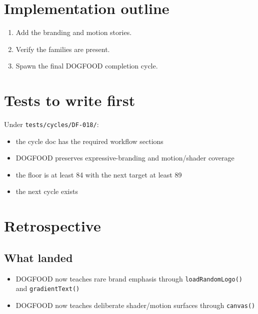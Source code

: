 \section{Implementation outline}\label{record-080-implementation-outline}

\begin{enumerate}
\def\labelenumi{\arabic{enumi}.}
\tightlist
\item
  Add the branding and motion stories.
\item
  Verify the families are present.
\item
  Spawn the final DOGFOOD completion cycle.
\end{enumerate}

\section{Tests to write first}\label{record-080-tests-to-write-first}

Under \texttt{t\allowbreak{}e\allowbreak{}s\allowbreak{}t\allowbreak{}s\allowbreak{}/\allowbreak{}c\allowbreak{}y\allowbreak{}c\allowbreak{}l\allowbreak{}e\allowbreak{}s\allowbreak{}/\allowbreak{}D\allowbreak{}F\allowbreak{}-\allowbreak{}0\allowbreak{}1\allowbreak{}8\allowbreak{}/}:

\begin{itemize}
\tightlist
\item
  the cycle doc has the required workflow sections
\item
  DOGFOOD preserves expressive-branding and motion/shader coverage
\item
  the floor is at least 84 with the next target at least 89
\item
  the next cycle exists
\end{itemize}

\section{Retrospective}\label{record-080-retrospective}

\subsection{What landed}\label{record-080-what-landed}

\begin{itemize}
\tightlist
\item
  DOGFOOD now teaches rare brand emphasis through \texttt{l\allowbreak{}o\allowbreak{}a\allowbreak{}d\allowbreak{}R\allowbreak{}a\allowbreak{}n\allowbreak{}d\allowbreak{}o\allowbreak{}m\allowbreak{}L\allowbreak{}o\allowbreak{}g\allowbreak{}o\allowbreak{}(\allowbreak{})} and \texttt{g\allowbreak{}r\allowbreak{}a\allowbreak{}d\allowbreak{}i\allowbreak{}e\allowbreak{}n\allowbreak{}t\allowbreak{}T\allowbreak{}e\allowbreak{}x\allowbreak{}t\allowbreak{}(\allowbreak{})}
\item
  DOGFOOD now teaches deliberate shader/motion surfaces through \texttt{c\allowbreak{}a\allowbreak{}n\allowbreak{}v\allowbreak{}a\allowbreak{}s\allowbreak{}(\allowbreak{})}
\end{itemize}

